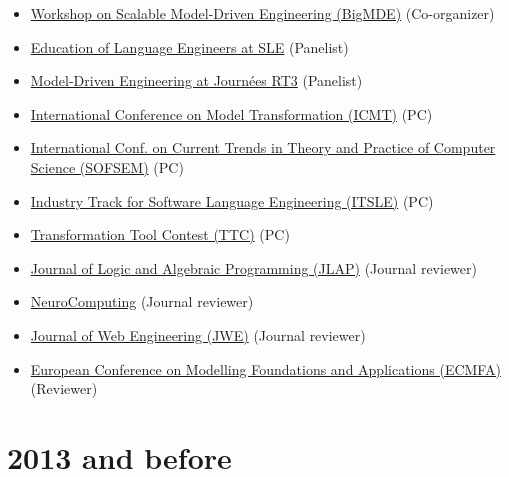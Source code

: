 \begin{itemize}
\tightlist
\item
  \href{https://big-mde.github.io/2014.html}{Workshop on Scalable
  Model-Driven Engineering (BigMDE)} (Co-organizer)
\item
  \href{http://www.sleconf.org/2014/Panel.html}{Education of Language
  Engineers at SLE} (Panelist)
\item
  \href{https://rth3.wp.mines-telecom.fr/journees-rt3/}{Model-Driven
  Engineering at Journées RT3} (Panelist)
\item
  \href{http://www.di.univaq.it/ICMT2014/}{International Conference on
  Model Transformation (ICMT)} (PC)
\item
  \href{http://sofsem14.ics.upjs.sk/}{International Conf. on Current
  Trends in Theory and Practice of Computer Science (SOFSEM)} (PC)
\item
  \href{http://www.sleconf.org/2014/ITSLE.html}{Industry Track for
  Software Language Engineering (ITSLE)} (PC)
\item
  \href{http://www.transformation-tool-contest.eu/2014/}{Transformation
  Tool Contest (TTC)} (PC)
\item
  \href{http://www.journals.elsevier.com/the-journal-of-logic-and-algebraic-programming}{Journal
  of Logic and Algebraic Programming (JLAP)} (Journal reviewer)
\item
  \href{http://www.journals.elsevier.com/neurocomputing}{NeuroComputing}
  (Journal reviewer)
\item
  \href{http://www.rintonpress.com/journals/jwe/}{Journal of Web
  Engineering (JWE)} (Journal reviewer)
\item
  \href{http://ecmfa2014.lcc.uma.es/\#}{European Conference on Modelling
  Foundations and Applications (ECMFA)} (Reviewer)
\end{itemize}

\hypertarget{and-before}{%
\section{2013 and before}\label{and-before}}

